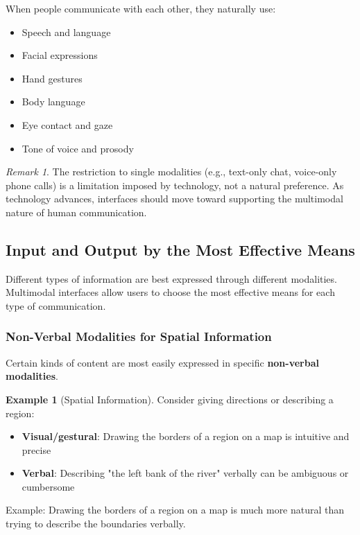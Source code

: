 \documentclass[11pt,a4paper]{article}
\theoremstyle{definition}
\newtheorem{example}{Example}[section]
\theoremstyle{plain}
\theoremstyle{remark}
\newtheorem*{remark}{Remark}
\begin{document}
When people communicate with each other, they naturally use:
\begin{itemize}
    \item Speech and language
    \item Facial expressions
    \item Hand gestures
    \item Body language
    \item Eye contact and gaze
    \item Tone of voice and prosody
\end{itemize}

\begin{remark}
The restriction to single modalities (e.g., text-only chat, voice-only phone calls) is a limitation imposed by technology, not a natural preference. As technology advances, interfaces should move toward supporting the multimodal nature of human communication.
\end{remark}

\subsection{Input and Output by the Most Effective Means}

Different types of information are best expressed through different modalities. Multimodal interfaces allow users to choose the most effective means for each type of communication.

\subsubsection{Non-Verbal Modalities for Spatial Information}

Certain kinds of content are most easily expressed in specific \textbf{non-verbal modalities}.

\begin{example}[Spatial Information]
Consider giving directions or describing a region:
\begin{itemize}
    \item \textbf{Visual/gestural}: Drawing the borders of a region on a map is intuitive and precise
    \item \textbf{Verbal}: Describing "the left bank of the river" verbally can be ambiguous or cumbersome
\end{itemize}

Example: Drawing the borders of a region on a map is much more natural than trying to describe the boundaries verbally.
\end{example}
\end{document}
